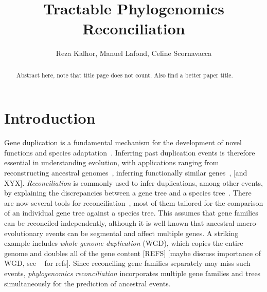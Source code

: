 \documentclass[10pt]{article}
\title{Tractable Phylogenomics Reconciliation}
\author{Reza Kalhor, Manuel Lafond, Celine Scornavacca}
\date{}
\newcommand{\ml}[1]{\begingroup\color{blue}#1\endgroup}
\newcommand{\rk}[1]{\begingroup\color{red}#1\endgroup}
\begin{document}
\maketitle


\begin{abstract}
    Abstract here, note that title page does not count.
    Also find a better paper title.
\end{abstract}

\newpage




\section{Introduction}


Gene duplication is a fundamental mechanism for the development of novel functions and species adaptation~\cite{ohno1970evolution}. 
Inferring past duplication events is therefore essential in understanding evolution, with applications ranging from 
reconstructing ancestral genomes~\cite{duchemin2017decostar}, inferring functionally similar genes~\cite{ullah2015integrating,lafond2018accurate,hellmuth2015phylogenomics}, \ml{[and XYX]}.
\emph{Reconciliation} is commonly used to infer duplications, among other events, by explaining the discrepancies between a gene tree and a species tree~\cite{goodman1979fitting}.
There are now several tools for reconciliation~\cite{doyon2010efficient,jacox2016eccetera,durand2006hybrid,bansal2018ranger}, most of them tailored for the comparison of an individual gene tree against a species tree.  This assumes that gene families can be reconciled independently, although it is well-known that ancestral macro-evolutionary events can be segmental and affect multiple genes.  A striking example includes \emph{whole genome duplication} (WGD), which copies the entire genome and doubles all of the gene content [REFS] \ml{[maybe discuss importance of WGD, see ~\cite{gorecki2024unifying} for refs]}.  Since reconciling gene families separately may miss such events, \emph{phylogenomics reconciliation} incorporates multiple gene families and trees simultaneously for the prediction of ancestral events.
\end{document}
